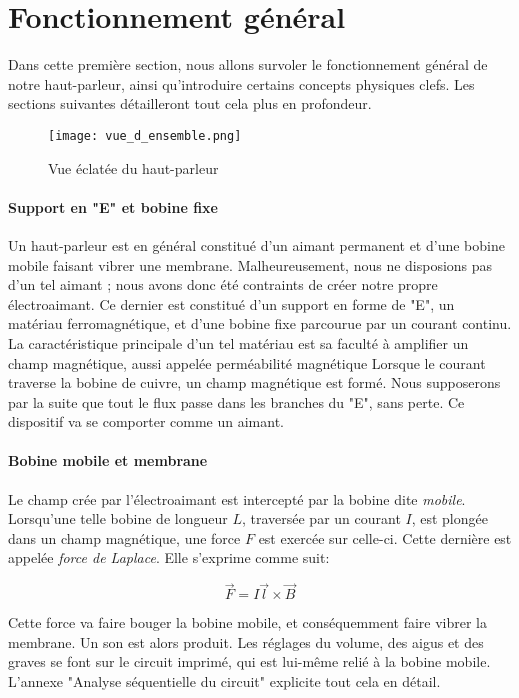 

\section{Fonctionnement général}

Dans cette première section, nous allons survoler le fonctionnement général de notre haut-parleur, ainsi 
qu'introduire certains concepts physiques clefs. Les sections suivantes détailleront tout cela plus en 
profondeur.

\begin{figure}[ht!] 
\centering 
\texttt{[image: vue\_d\_ensemble.png]} 
\caption{Vue éclatée du haut-parleur} 
\label{hp-scheme} 
\end{figure}

\paragraph{}

\paragraph{Support en "E" et bobine fixe}
Un haut-parleur est en général constitué d'un aimant permanent et d'une bobine mobile faisant vibrer une 
membrane. Malheureusement, nous ne disposions pas d'un tel aimant ; nous avons donc été contraints de créer
notre propre électroaimant. Ce dernier est constitué d'un support en forme de "E", un matériau ferromagnétique, et 
d'une bobine fixe parcourue par un courant continu. La caractéristique principale d'un tel matériau est sa 
faculté à amplifier un champ magnétique, aussi appelée perméabilité magnétique \cite{wiki-perm-magn}
Lorsque le courant traverse la bobine de cuivre, un champ magnétique est formé. Nous supposerons par la 
suite que tout le flux passe dans les branches du "E", sans perte. Ce dispositif va se comporter comme un
aimant.

\paragraph{Bobine mobile et membrane}
Le champ crée par l'électroaimant est intercepté par la bobine dite \textit{mobile}. Lorsqu'une telle bobine
de longueur $L$, traversée par un courant $I$, est plongée dans un champ magnétique, une force $F$ est exercée
sur celle-ci. Cette dernière est appelée \textit{force de Laplace}. Elle s'exprime comme suit:

$$\vec{F} = I\vec{l}\times{\vec{B}}$$ 

Cette force va faire bouger la bobine mobile, et conséquemment faire vibrer la membrane. Un son est alors 
produit. Les réglages du volume, des aigus et des graves se font sur le circuit imprimé, qui est lui-même relié à la
bobine mobile. L'annexe "Analyse séquentielle du circuit" explicite tout cela en détail.

